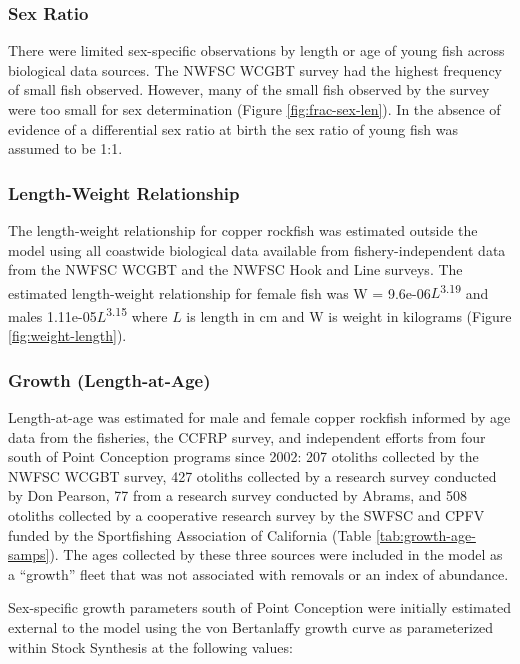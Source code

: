 \documentclass[11pt,
  english,
  letterpaper,
]{article}
\begin{document}
\hypertarget{sex-ratio}{%
\subsubsection{Sex Ratio}\label{sex-ratio}}

There were limited sex-specific observations by length or age of young fish across biological data sources. The NWFSC WCGBT survey had the highest frequency of small fish observed. However, many of the small fish observed by the survey were too small for sex determination (Figure \ref{fig:frac-sex-len}). In the absence of evidence of a differential sex ratio at birth the sex ratio of young fish was assumed to be 1:1.

\hypertarget{length-weight-relationship}{%
\subsubsection{Length-Weight Relationship}\label{length-weight-relationship}}

The length-weight relationship for copper rockfish was estimated outside the model using all coastwide biological data available from fishery-independent data from the NWFSC WCGBT and the NWFSC Hook and Line surveys. The estimated length-weight relationship for female fish was W = 9.6e-06\(L\)\textsuperscript{3.19} and males 1.11e-05\(L\)\textsuperscript{3.15} where \(L\) is length in cm and W is weight in kilograms (Figure \ref{fig:weight-length}).

\hypertarget{length-at-age}{%
\subsubsection{Growth (Length-at-Age)}\label{length-at-age}}

Length-at-age was estimated for male and female copper rockfish informed by age data from the fisheries, the CCFRP survey, and independent efforts from four south of Point Conception programs since 2002: 207 otoliths collected by the NWFSC WCGBT survey, 427 otoliths collected by a research survey conducted by Don Pearson, 77 from a research survey conducted by Abrams, and 508 otoliths collected by a cooperative research survey by the SWFSC and CPFV funded by the Sportfishing Association of California (Table \ref{tab:growth-age-samps}). The ages collected by these three sources were included in the model as a ``growth'' fleet that was not associated with removals or an index of abundance.

Sex-specific growth parameters south of Point Conception were initially estimated external to the model using the von Bertanlaffy growth curve as parameterized within Stock Synthesis at the following values:
\end{document}
